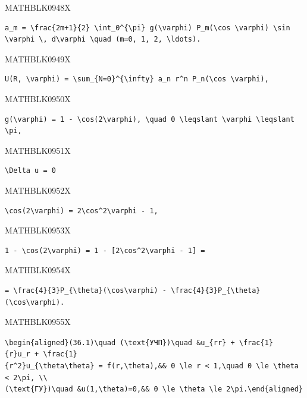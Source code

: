 \documentclass[
  ukrainian,
]{article}
\begin{document}
MATHBLK0948X

\begin{verbatim}
a_m = \frac{2m+1}{2} \int_0^{\pi} g(\varphi) P_m(\cos \varphi) \sin \varphi \, d\varphi \quad (m=0, 1, 2, \ldots).
\end{verbatim}

MATHBLK0949X

\begin{verbatim}
U(R, \varphi) = \sum_{N=0}^{\infty} a_n r^n P_n(\cos \varphi),
\end{verbatim}

MATHBLK0950X

\begin{verbatim}
g(\varphi) = 1 - \cos(2\varphi), \quad 0 \leqslant \varphi \leqslant \pi,
\end{verbatim}

MATHBLK0951X

\begin{verbatim}
\Delta u = 0
\end{verbatim}

MATHBLK0952X

\begin{verbatim}
\cos(2\varphi) = 2\cos^2\varphi - 1,
\end{verbatim}

MATHBLK0953X

\begin{verbatim}
1 - \cos(2\varphi) = 1 - [2\cos^2\varphi - 1] =
\end{verbatim}

MATHBLK0954X

\begin{verbatim}
= \frac{4}{3}P_{\theta}(\cos\varphi) - \frac{4}{3}P_{\theta}(\cos\varphi).
\end{verbatim}

MATHBLK0955X

\texttt{\textbackslash{}begin\{aligned\}(36.1)\textbackslash{}quad\ (\textbackslash{}text\{УЧП\})\textbackslash{}quad\ \&u\_\{rr\}\ +\ \textbackslash{}frac\{1\}\{r\}u\_r\ +\ \textbackslash{}frac\{1\}\{r\^{}2\}u\_\{\textbackslash{}theta\textbackslash{}theta\}\ =\ f(r,\textbackslash{}theta),\&\&\ 0\ \textbackslash{}le\ r\ \textless{}\ 1,\textbackslash{}quad\ 0\ \textbackslash{}le\ \textbackslash{}theta\ \textless{}\ 2\textbackslash{}pi,\ \textbackslash{}\textbackslash{}(\textbackslash{}text\{ГУ\})\textbackslash{}quad\ \&u(1,\textbackslash{}theta)=0,\&\&\ 0\ \textbackslash{}le\ \textbackslash{}theta\ \textbackslash{}le\ 2\textbackslash{}pi.\textbackslash{}end\{aligned\}}
\end{document}
